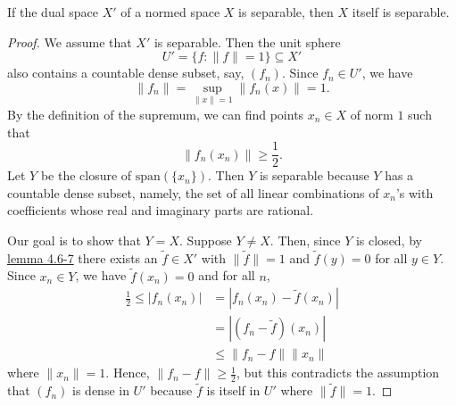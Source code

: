 \begin{theorem}[Separability]
    If the dual space \( X' \) of a normed space \( X  \) is separable, then \( X  \) itself is separable.
\end{theorem}
\begin{proof}
We assume that \( X'  \) is separable. Then the unit sphere 
\[  U' = \{  f : \|f\| = 1  \}  \subseteq X' \]
also contains a countable dense subset, say, \( ({f}_{n}) \). Since \( {f}_{n} \in U' \), we have  
\[  \|{f}_{n}\| = \sup_{\|x\| = 1} \|{f}_{n}(x)\| = 1.  \]
By the definition of the supremum, we can find points \( {x}_{n} \in X  \) of norm \( 1  \) such that 
\[  \|{f}_{n}({x}_{n})\| \geq \frac{ 1 }{ 2 }. \]
Let \( Y  \) be the closure of \( \text{span}(\{ {x}_{n} \} ) \). Then \( Y \) is separable because \( Y  \) has a countable dense subset, namely, the set of all linear combinations of \( {x}_{n} \)'s with coefficients whose real and imaginary parts are rational.

Our goal is to show that \( Y = X  \). Suppose \( Y \neq X  \). Then, since \( Y  \) is closed, by {\hyperref[4.6-7]{lemma 4.6-7}} there exists an \( \tilde{f} \in X' \) with \( \|\tilde{f}\| = 1   \) and \( \tilde{f}(y) = 0  \) for all \( y \in Y \). Since \( {x}_{n} \in Y \), we have \( \tilde{f}({x}_{n}) =0  \) and for all \( n  \),   
\begin{align*}
    \frac{ 1 }{ 2 }  \leq | {f}_{n}({x}_{n}) |  &= | {f}_{n}({x}_{n}) - \tilde{f}({x}_{n}) |  \\
                                                &= | ({f}_{n} - \tilde{f})({x}_{n}) |   \\
                                                &\leq \|{f}_{n} - f\| \|{x}_{n}\|
\end{align*}
where \( \|{x}_{n}\| = 1  \). Hence, \( \|{f}_{n} - f \| \geq \frac{ 1 }{ 2 }  \), but this contradicts the assumption that \( ({f}_{n}) \) is dense in \( U' \) because \( \tilde{f}  \) is itself in \( U' \) where \( \|\tilde{f}\| = 1  \).
\end{proof}
